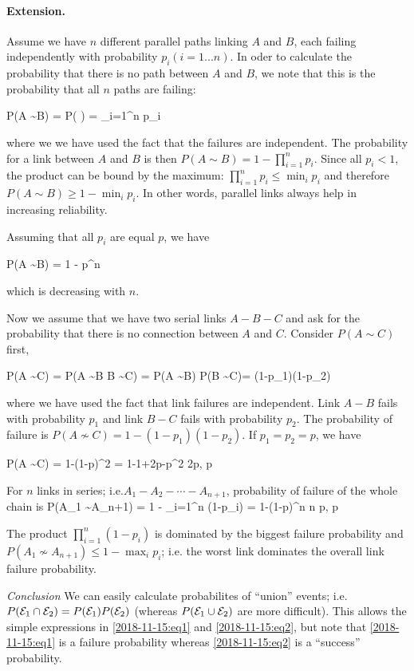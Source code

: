 \paragraph{Extension.} Assume we have $n$ different parallel paths linking $A$ and $B$, each failing independently with probability $p_i (i=1...n)$. In oder to calculate the probability that there is no path between $A$ and $B$, we note that this is the probability that all $n$ paths are failing:

\be\label{2018-11-15:eq1}
P(A \not\sim B) = P( \cap {} \cap \cdots \cap {}) = \prod_{i=1}^n p_i
\ee

where we we have used the fact that the failures are independent. The probability for a link between $A$ and $B$ is then $P(A \sim B) = 1 - \prod_{i=1}^n p_i$. Since all $p_i < 1$, the product can be bound by the maximum: $\prod_{i=1}^n p_i \leq \min_i p_i$ and therefore $P(A \sim B) \geq 1 - \min_i p_i$. In other words, parallel links always help in increasing reliability. 

Assuming that all $p_i$ are equal $p$, we have

\bee
P(A \sim B) = 1 - p^n
\eee

which is decreasing with $n$.


Now we assume that we have two serial links $A-B-C$ and ask for the probability that there is no connection between $A$ and $C$. Consider $P(A \sim C)$ first,

\be\label{2018-11-15:eq2}
P(A \sim C) = P(A \sim B \cap B \sim C) = P(A \sim B) P(B \sim C)= (1-p_1)(1-p_2)
\ee

where we have used the fact that link failures are independent. Link $A-B$ fails with probability $p_1$ and link $B-C$ fails with probability $p_2$. The probability of failure is $P(A \not\sim C) = 1 - (1-p_1)(1-p_2)$. If $p_1=p_2=p$, we have

\bee
P(A \not\sim C) = 1-(1-p)^2 = 1-1+2p-p^2 \approx 2p, \quad p 
\eee

For $n$ links in series; i.e.$A_1 - A_2 - \cdots - A_{n+1}$, probability of failure of the whole chain is
\bee
P(A_1 \not\sim A_{n+1}) = 1 - \prod_{i=1}^n (1-p_i) = 1-(1-p)^n \approx n p, \quad p 
\eee

The product $\prod_{i=1}^n (1-p_i)$ is dominated by the biggest failure probability and $P(A_1 \not\sim A_{n+1}) \leq 1 - \max_i p_i$; i.e. the worst link dominates the overall link failure probability.

\emph{Conclusion} We can easily calculate probabilites of ``union'' events; i.e. $P(\mathcal{E}_1 \cap \mathcal{E}_2) = P(\mathcal{E}_1) P(\mathcal{E}_2)$ (whereas $P(\mathcal{E}_1 \cup \mathcal{E}_2)$ are more difficult). This allows the simple expressions in \eqref{2018-11-15:eq1} and \eqref{2018-11-15:eq2}, but note that \eqref{2018-11-15:eq1} is a failure probability whereas \eqref{2018-11-15:eq2} is a ``success'' probability.


